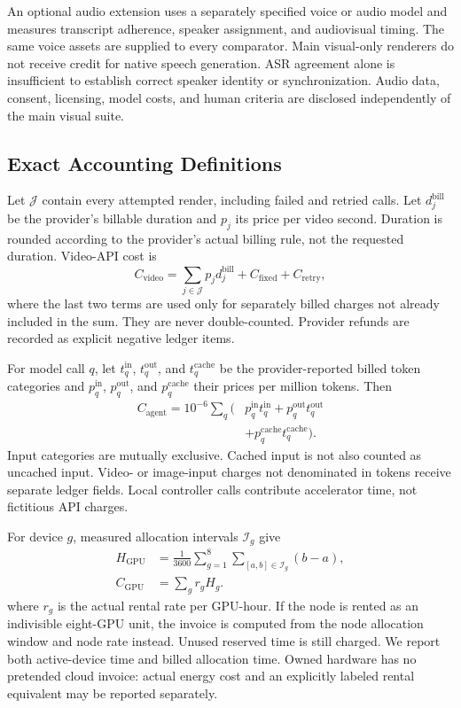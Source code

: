 An optional audio extension uses a separately specified voice or audio model
and measures transcript adherence, speaker assignment, and audiovisual timing.
The same voice assets are supplied to every comparator. Main visual-only
renderers do not receive credit for native speech generation. ASR agreement
alone is insufficient to establish correct speaker identity or synchronization.
Audio data, consent, licensing, model costs, and human criteria are disclosed
independently of the main visual suite.

\subsection{Exact Accounting Definitions}
Let $\mathcal{J}$ contain every attempted render, including failed and retried
calls. Let $d_j^{\mathrm{bill}}$ be the provider's billable duration and $p_j$
its price per video second. Duration is rounded according to the provider's
actual billing rule, not the requested duration. Video-API cost is
\begin{equation}
C_{\mathrm{video}} = \sum_{j\in\mathcal{J}} p_jd_j^{\mathrm{bill}}
 + C_{\mathrm{fixed}} + C_{\mathrm{retry}},
\end{equation}
where the last two terms are used only for separately billed charges not
already included in the sum. They are never double-counted. Provider refunds
are recorded as explicit negative ledger items.

For model call $q$, let $t_q^{\mathrm{in}}$, $t_q^{\mathrm{out}}$, and
$t_q^{\mathrm{cache}}$ be the provider-reported billed token categories and
$p_q^{\mathrm{in}}$, $p_q^{\mathrm{out}}$, and $p_q^{\mathrm{cache}}$ their
prices per million tokens. Then
\begin{align}
C_{\mathrm{agent}}=10^{-6}\sum_q (&p_q^{\mathrm{in}}t_q^{\mathrm{in}}
 + p_q^{\mathrm{out}}t_q^{\mathrm{out}} \nonumber\\
 &+p_q^{\mathrm{cache}}t_q^{\mathrm{cache}}).
\end{align}
Input categories are mutually exclusive. Cached input is not also counted as
uncached input. Video- or image-input charges not denominated in tokens receive
separate ledger fields. Local controller calls contribute accelerator time,
not fictitious API charges.

For device $g$, measured allocation intervals $\mathcal{I}_g$ give
\begin{align}
H_{\mathrm{GPU}} &= \frac{1}{3600}
\sum_{g=1}^{8}\sum_{[a,b]\in\mathcal{I}_g}(b-a), \\
C_{\mathrm{GPU}}&=\sum_g r_gH_g.
\end{align}
where $r_g$ is the actual rental rate per GPU-hour. If the node is rented as an
indivisible eight-GPU unit, the invoice is computed from the node allocation
window and node rate instead. Unused reserved time is still charged. We report
both active-device time and billed allocation time. Owned hardware has no
pretended cloud invoice: actual energy cost and an explicitly labeled rental
equivalent may be reported separately.

